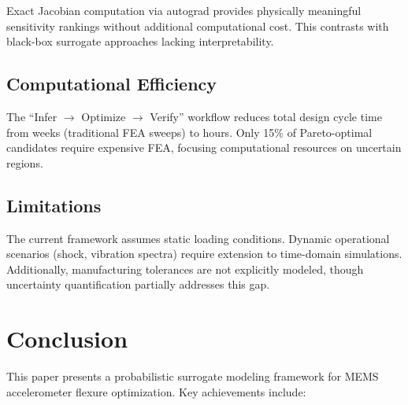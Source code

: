 \documentclass{elsarticle}
\begin{document}
Exact Jacobian computation via autograd provides physically meaningful sensitivity rankings without additional computational cost. This contrasts with black-box surrogate approaches lacking interpretability.

\subsection{Computational Efficiency}

The ``Infer \(\rightarrow\) Optimize \(\rightarrow\) Verify'' workflow reduces total design cycle time from weeks (traditional FEA sweeps) to hours. Only 15\% of Pareto-optimal candidates require expensive FEA, focusing computational resources on uncertain regions.

\subsection{Limitations}

The current framework assumes static loading conditions. Dynamic operational scenarios (shock, vibration spectra) require extension to time-domain simulations. Additionally, manufacturing tolerances are not explicitly modeled, though uncertainty quantification partially addresses this gap.

\section{Conclusion}
\label{sec:conclusion}

This paper presents a probabilistic surrogate modeling framework for MEMS accelerometer flexure optimization. Key achievements include:



\cite{mems_review_2023}





\end{document}

